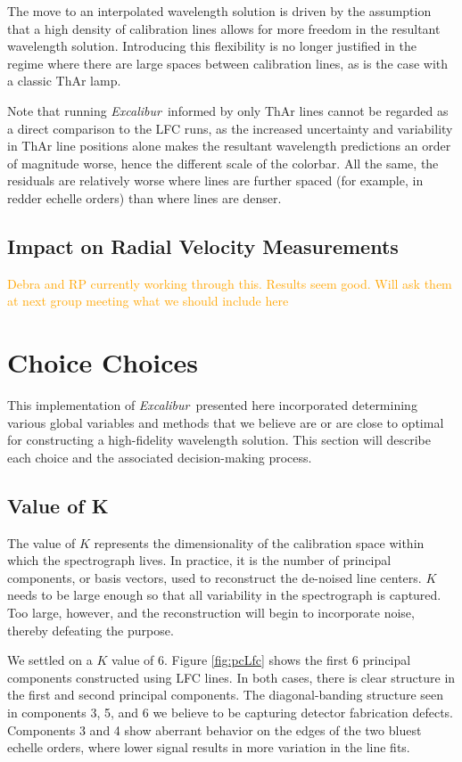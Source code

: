 \documentclass[12pt, onecolumn]{aastex63}
\newcommand{\lz}[1]{\textcolor{orange}{#1}}
\newcommand{\project}[1]{\textsl{#1}}
\newcommand{\name}{\project{Excalibur}}
\begin{document}
The move to an interpolated wavelength solution is driven by the assumption that a high density of calibration lines allows for more freedom in the resultant wavelength solution.  Introducing this flexibility is no longer justified in the regime where there are large spaces between calibration lines, as is the case with a classic ThAr lamp.

Note that running \name\ informed by only ThAr lines cannot be regarded as a direct comparison to the LFC runs, as the increased uncertainty and variability in ThAr line positions alone makes the resultant wavelength predictions an order of magnitude worse, hence the different scale of the colorbar.  All the same, the residuals are relatively worse where lines are further spaced (for example, in redder echelle orders) than where lines are denser.

\subsection{Impact on Radial Velocity Measurements}\label{sec:test-rv}
\lz{Debra and RP currently working through this.  Results seem good.  Will ask them at next group meeting what we should include here}


\section{Choice Choices} \label{sec:choices}
This implementation of \name\ presented here incorporated determining various global variables and methods that we believe are or are close to optimal for constructing a high-fidelity wavelength solution.  This section will describe each choice and the associated decision-making process.

\subsection{Value of K}
The value of $K$ represents the dimensionality of the calibration space within which the spectrograph lives.  In practice, it is the number of principal components, or basis vectors, used to reconstruct the de-noised line centers.  $K$ needs to be large enough so that all variability in the spectrograph is captured.  Too large, however, and the reconstruction will begin to incorporate noise, thereby defeating the purpose.

We settled on a $K$ value of 6.  Figure \ref{fig:pcLfc} shows the first 6 principal components constructed using LFC lines.  In both cases, there is clear structure in the first and second principal components.  The diagonal-banding structure seen in components 3, 5, and 6 we believe to be capturing detector fabrication defects.  Components 3 and 4 show aberrant behavior on the edges of the two bluest echelle orders, where lower signal results in more variation in the line fits.
\end{document}
